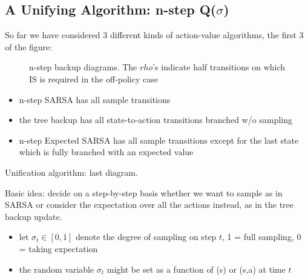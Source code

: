 \documentclass[sutton_barto_notes.tex]{subfiles}
\begin{document}
\newpage
\subsection{A Unifying Algorithm: n-step Q($\sigma$)}

So far we have considered 3 different kinds of action-value algorithms, the first 3 of the figure:
\begin{figure}[h!]
    \centering
    \caption{ n-step backup diagrams. The $rho$'s indicate half transitions on which IS is required in the off-policy case }
\end{figure}
\begin{itemize}
\item n-step SARSA has all sample transitions
\item the tree backup has all state-to-action transitions branched w/o sampling
\item n-step Expected SARSA has all sample transitions except for the last state which is fully branched with an expected value
\end{itemize}

Unification algorithm: last diagram.

Basic idea: decide on a step-by-step basis whether we want to sample as in SARSA or consider the expectation over all the actions instead, as in the tree backup update.

\begin{itemize}
\item let $\sigma_t \in [0,1]$ denote the degree of sampling on step $t$, 1 = full sampling, 0 = taking expectation
\item the random variable $\sigma_t$ might be set as a function of (s) or (s,a) at time $t$
\end{itemize}
\end{document}
